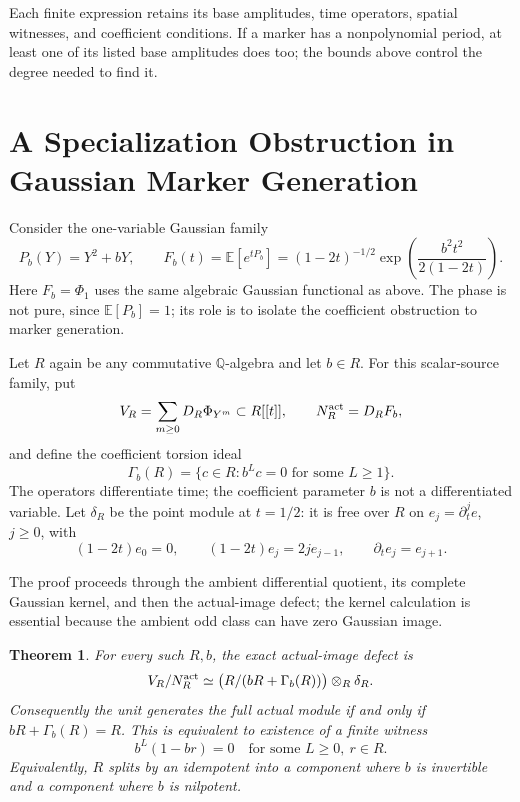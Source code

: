 \documentclass[11pt]{article}
\newtheorem{theorem}{Theorem}[section]
\theoremstyle{definition}\newtheorem{definition}[theorem]{Definition}
\theoremstyle{remark}\newtheorem{remark}[theorem]{Remark}
\newcommand{\E}{\mathbb E}
\begin{document}
Each finite expression retains its base amplitudes, time operators,
spatial witnesses, and coefficient conditions. If a marker has a
nonpolynomial period, at least one of its listed base amplitudes does
too; the bounds above control the degree needed to find it.

\section{A Specialization Obstruction in Gaussian Marker Generation}
\label{sec:specialization}

Consider the one-variable Gaussian family
\[
 P_b(Y)=Y^2+bY,\qquad
 F_b(t)=\E[e^{tP_b}]
   =(1-2t)^{-1/2}\exp\!\left(\frac{b^2t^2}{2(1-2t)}\right).
\]
Here $F_b=\Phi_1$ uses the same algebraic Gaussian functional as above.
The phase is not pure, since $\E[P_b]=1$; its role is to isolate
the coefficient obstruction to marker generation.

Let $R$ again be any commutative $\mathbb Q$-algebra and let $b\in R$.
For this scalar-source family, put
\[
 V_R=\sum_{m\ge0}D_R\Phi_{Y^m}\subset R[[t]],\qquad
 N_R^{\rm act}=D_RF_b,
\]
and define the coefficient torsion ideal
\[
 \Gamma_b(R)=\{c\in R:b^Lc=0\text{ for some }L\ge1\}.
\]
The operators differentiate time; the coefficient parameter $b$
is not a differentiated variable.
Let $\delta_R$ be the point module at $t=1/2$: it is free over
$R$ on $e_j=\partial_t^j e$, $j\ge0$, with
\[
 (1-2t)e_0=0,\qquad
 (1-2t)e_j=2j e_{j-1},\qquad\partial_t e_j=e_{j+1}.
\]

The proof proceeds through the ambient differential quotient, its complete
Gaussian kernel, and then the actual-image defect; the kernel calculation
is essential because the ambient odd class can have zero Gaussian image.

\begin{theorem}\label{thm:allrings}
For every such $R,b$, the exact actual-image defect is
\begin{equation}\label{eq:defect}
 V_R/N_R^{\rm act}\simeq
     \bigl(R/(bR+\Gamma_b(R))\bigr)\otimes_R\delta_R.
\end{equation}
Consequently the unit generates the full actual module if and
only if $bR+\Gamma_b(R)=R$. This is equivalent to existence of
a finite witness
\begin{equation}\label{eq:stabilization}
 b^L(1-br)=0\quad\text{for some }L\ge0,\ r\in R.
\end{equation}
Equivalently, $R$ splits by an idempotent into a component where
$b$ is invertible and a component where $b$ is nilpotent.
\end{theorem}
\end{document}
